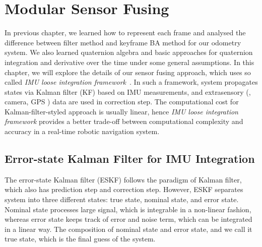 \chapter{Modular Sensor Fusing}
\label{chap:sensor_fusing}

In previous chapter, we learned how to represent each frame and analysed the difference between filter method and keyframe BA method for our odometry system. We also learned quaternion algebra and basic approaches for quaternion integration and derivative over the time under some general assumptions. In this chapter, we will explore the details of our sensor fusing approach, which uses so called \textit{IMU loose integration framework}~\cite{weiss2012vision}. In such a framework, system propagates states via Kalman filter (KF) based on IMU measurements, and extrasensory (\eg, camera, GPS \etc) data are used in correction step. The computational cost for Kalman-filter-styled approach is usually linear, hence \textit{IMU loose integration framework} provides a better trade-off between computational complexity and accuracy in a real-time robotic navigation system.

\section{Error-state Kalman Filter for IMU Integration}
\label{sec:ESKF_IMU}

The error-state Kalman filter (ESKF) follows the paradigm of Kalman filter, which also has prediction step and correction step. However, ESKF separates system into three different states: true state, nominal state, and error state. Nominal state processes large signal, which is integrable in a non-linear fashion, whereas error state keeps track of error and noise term, which can be integrated in a linear way. The composition of nominal state and error state, and we call it true state, which is the final guess of the system.

